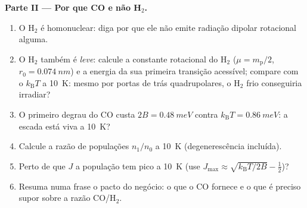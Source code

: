 \begin{problem}
\medskip\noindent\textbf{Parte II --- Por que CO e não H$_2$.}
\begin{enumerate}[resume]
  \item O H$_2$ é homonuclear: diga por que ele não emite radiação
        dipolar rotacional alguma.
  \item O H$_2$ também é \emph{leve}: calcule a constante rotacional
        do H$_2$ ($\mu = m_{\text{p}}/2$, $r_0 = \qty{0.074}{nm}$) e a
        energia da sua primeira transição acessível; compare com o
        $k_{\text{B}}T$ a \qty{10}{K}: mesmo por portas de trás
        quadrupolares, o H$_2$ frio conseguiria irradiar?
  \item O primeiro degrau do CO custa $2B = \qty{0.48}{meV}$ contra
        $k_{\text{B}}T = \qty{0.86}{meV}$: a escada está viva a
        \qty{10}{K}?
  \item Calcule a razão de populações $n_1/n_0$ a \qty{10}{K}
        (degenerescência incluída).
  \item Perto de que $J$ a população tem pico a \qty{10}{K}
        (use $J_{\max} \approx \sqrt{k_{\text{B}}T/2B} - \tfrac12$)?
  \item Resuma numa frase o pacto do negócio: o que o CO fornece e o
        que é preciso supor sobre a razão CO/H$_2$.
\end{enumerate}


\end{problem}
